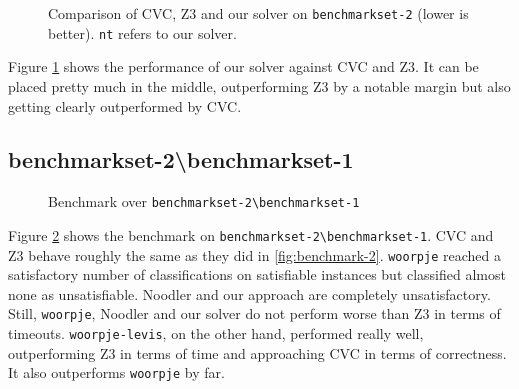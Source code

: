 \begin{figure}%
\begin{center}
\resizebox{0.6 \textwidth}{!}{

}
\caption{Comparison of CVC, Z3 and our solver on \texttt{benchmarkset-2} (lower is better). \texttt{nt} refers to our solver.}
\label{fig:barplot-2}
\end{center}
\end{figure}

Figure \ref{fig:barplot-2} shows the performance of our solver against CVC and Z3. It can be placed pretty much in the middle, outperforming Z3 by a notable margin but also getting clearly outperformed by CVC.

\newpage

\subsection{benchmarkset-2\:\textbackslash\:benchmarkset-1}

\begin{figure}%
\caption{Benchmark over \texttt{benchmarkset-2\:\textbackslash\:benchmarkset-1}}
\label{fig:benchmark-2-without-1}
\end{figure}

Figure \ref{fig:benchmark-2-without-1} shows the benchmark on \texttt{benchmarkset-2\:\textbackslash\:benchmarkset-1}. CVC and Z3 behave roughly the same as they did in \ref{fig:benchmark-2}. \texttt{woorpje} reached a satisfactory number of classifications on satisfiable instances but classified almost none as unsatisfiable. Noodler and our approach are completely unsatisfactory. Still, \texttt{woorpje}, Noodler and our solver do not perform worse than Z3 in terms of timeouts. \texttt{woorpje-levis}, on the other hand, performed really well, outperforming Z3 in terms of time and approaching CVC in terms of correctness. It also outperforms \texttt{woorpje} by far.


